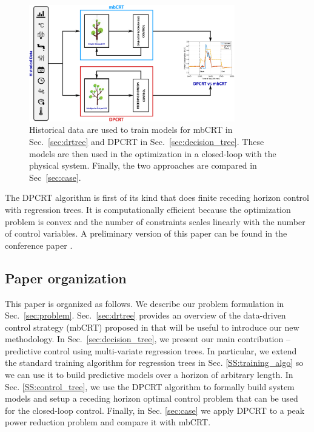\begin{figure}[t!]
	\begin{center}
		\hspace{0.8cm}
		\includegraphics[width=0.8\textwidth]{Figures/scheme.eps}
		\centering
		\caption{Historical data are used to train models for mbCRT in Sec.~\ref{sec:drtree} and DPCRT in Sec.~\ref{sec:decision_tree}. These models are then used in the optimization in a closed-loop with the physical system. Finally, the two approaches are compared in Sec~\ref{sec:case}.}
		\label{F:scheme}
		\vspace{-10pt}
	\end{center}
\end{figure}

The DPCRT algorithm is first of its kind that does finite receding horizon control with regression trees. 
It is computationally efficient because the optimization problem is convex and the number of constraints scales linearly with the number of control variables. 
A preliminary version of this paper can be found in the conference paper \cite{JainBuildsys2016}.

\subsection{Paper organization}

This paper is organized as follows. We describe our problem formulation in Sec.~\ref{sec:problem}. 
Sec.~\ref{sec:drtree} provides an overview of the data-driven control strategy (mbCRT) proposed in \cite{Behl201630} that will be useful to introduce our new methodology. 
In Sec.~\ref{sec:decision_tree}, we present our main contribution -- predictive control using multi-variate regression trees. 
In particular, we extend the standard training algorithm for regression trees in Sec. \ref{SS:training_algo} so we can use it to build predictive models over a horizon of arbitrary length. 
In Sec. \ref{SS:control_tree}, we use the DPCRT algorithm to formally build system models and setup a receding horizon optimal control problem that can be used for the closed-loop control. 
Finally, in Sec. \ref{sec:case} we apply DPCRT to a peak power reduction problem and compare it with mbCRT.

